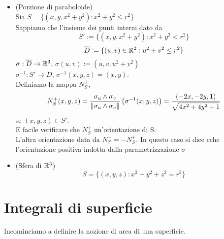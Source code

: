 \begin{example}
  \begin{itemize}
    \item (Porzione di paraboloide) \\
          Sia $S=\{(x,y,x^2+y^2): x^2+y^2\leq r^2\}$ \\
          Sappiamo che l'insieme dei punti interni \ace dato da 
          $$S':=\{(x,y,x^2+y^2):x^2+y^2< r^2\}$$
          $$\overline{D} := \{(u,v)\in\mathbb{R}^2 : u^2+v^2\leq r^2\}$$
          $\sigma:\overline{D}\to\mathbb{R}^3$, $\sigma(u,v):= (u,v,u^2+v^2)$\\
          $\sigma^{-1}:S' \to D$, $\sigma^{-1}(x,y,z)=(x,y)$. \\
          Definiamo la mappa $N_S^{+}$,
          $$N_S^{+}(x,y,z) = \frac{\sigma_u\wedge\sigma_v}{\left\lVert\sigma_u\wedge\sigma_v\right\rVert}\left(\sigma^{-1}(x,y,z)\right)
          = \frac{(-2x,-2y,1)}{\sqrt{4x^2+4y^2+1}}$$
          se $(x,y,z)\in S'$. \\
          \ac{E} facile verificare che $N_S^{+}$ \ace un'orientazione di S. \\
          L'altra orientazione \ace data da $N_S^{-} = -N_S^{+}$. 
          In questo caso si dice cche l'orientazione positiva \ace indotta dalla parametrizzazione $\sigma$
    \item (Sfera di $\mathbb{R}^3$) \\
          $$S = \{(x,y,z): x^2+y^2+z^2=r^2\}$$
  \end{itemize}
\end{example}
\section{Integrali di superficie}
Incominciamo a definire la nozione di area di una superficie.
